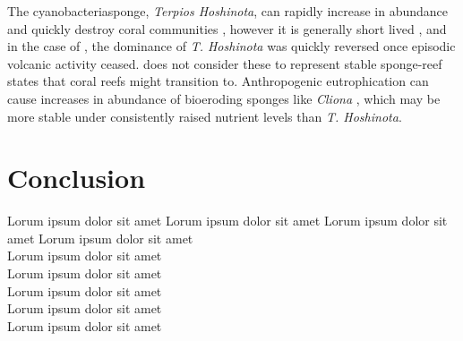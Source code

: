 \documentclass[11pt,a4paper]{article}
\begin{document}
 The cyanobacteriasponge, \textit{Terpios Hoshinota}, can rapidly increase in abundance and quickly destroy coral communities \citep{Schils2012,Elliott2016}, however it is generally short lived \citep{Reimer2010}, and in the case of \cite{Schils2012}, the dominance of \textit{T. Hoshinota} was quickly reversed once episodic volcanic activity ceased. 
 \cite{Bell2013} does not consider these to represent stable sponge-reef states that coral reefs might transition to.
  Anthropogenic eutrophication can cause increases in abundance of bioeroding sponges like \textit{Cliona} \citep{WardPaige2005}, which may be more stable under consistently raised nutrient levels than \textit{T. Hoshinota}. 


 
 
 

\section{Conclusion}
 Lorum ipsum dolor sit amet
  Lorum ipsum dolor sit amet
   Lorum ipsum dolor sit amet
    Lorum ipsum dolor sit amet\\
     Lorum ipsum dolor sit amet\\
      Lorum ipsum dolor sit amet\\
       Lorum ipsum dolor sit amet\\
        Lorum ipsum dolor sit amet\\
         Lorum ipsum dolor sit amet


\end{document}
